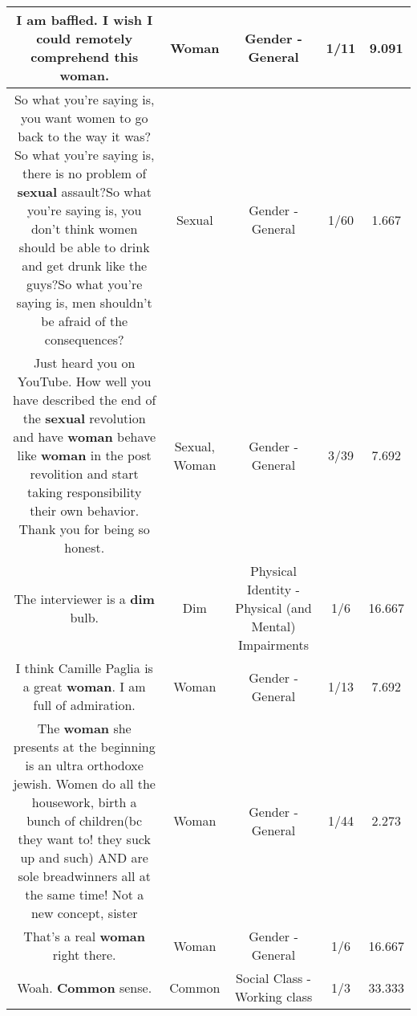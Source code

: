 \documentclass[11pt]{article}
\newlength\mylength
\begin{document}
\begin{center}
\begin{longtable}{|C{.65\mylength}|C{.30\mylength}|C{.12\mylength}|C{.12\mylength}|C{.12\mylength}|}
  \small I am baffled.  I wish I could remotely comprehend this \textbf{woman}.\normalsize   & Woman & Gender - General & 1/11 & 9.091 \\  \hline
  \small So what you're saying is, you want women to go back to the way it was?So what you're saying is, there is no problem of \textbf{sexual} assault?So what you're saying is, you don't think women should be able to drink and get drunk like the guys?So what you're saying is, men shouldn't be afraid of the consequences?\normalsize   & Sexual & Gender - General & 1/60 & 1.667 \\  \hline
  \small Just heard you on YouTube. How well you have described the end of the \textbf{sexual} revolution and have \textbf{woman} behave like \textbf{woman} in the post revolition and start taking responsibility their own behavior. Thank you for being so honest.\normalsize   & Sexual, Woman & Gender - General & 3/39 & 7.692 \\  \hline
  \small The interviewer is a \textbf{dim} bulb.\normalsize   & Dim & Physical Identity - Physical (and Mental) Impairments & 1/6 & 16.667 \\  \hline
  \small I think Camille Paglia is a great \textbf{woman}.  I am full of admiration.\normalsize   & Woman & Gender - General & 1/13 & 7.692 \\  \hline
  \small The \textbf{woman} she presents at the beginning is an ultra orthodoxe jewish. Women do all the housework, birth a bunch of children(bc they want to! they suck up and such) AND  are sole breadwinners  all at the same time! Not a new concept, sister\normalsize   & Woman & Gender - General & 1/44 & 2.273 \\  \hline
  \small That's a real \textbf{woman} right there.\normalsize   & Woman & Gender - General & 1/6 & 16.667 \\  \hline
  \small Woah. \textbf{Common} sense.\normalsize   & Common & Social Class - Working class & 1/3 & 33.333 \\  \hline

\end{longtable}
\end{center}
\end{document}
